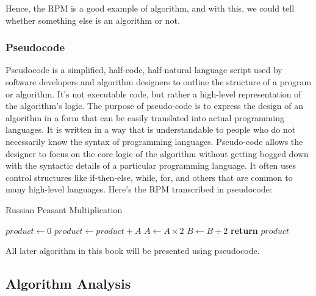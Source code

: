 \documentclass[
	12pt, %
	fleqn, %
	a4paper, %
]{LegrandOrangeBook}
\begin{document}
Hence, the RPM is a good example of algorithm, and with this, we could tell whether
something else is an algorithm or not.
\subsubsection{Pseudocode}
Pseudocode is a simplified, half-code, half-natural language script used by software developers and algorithm designers to outline the structure of a program or algorithm. It's not executable code, but rather a high-level representation of the algorithm's logic. The purpose of pseudo-code is to express the design of an algorithm in a form that can be easily translated into actual programming languages. It is written in a way that is understandable to people who do not necessarily know the syntax of programming languages. Pseudo-code allows the designer to focus on the core logic of the algorithm without getting bogged down with the syntactic details of a particular programming language. It often uses control structures like if-then-else, while, for, and others that are common to many high-level languages.
Here's the RPM transcribed in pseudocode:
\begin{algorithm}[H]
	\caption{Russian Peasant Multiplication}\label{alg:rpm}
	\begin{algorithmic}[1]
		\State $product \gets 0$
				\State $product \gets product + A$
			\EndIf
			\State $A \gets A \times 2$
			\State $B \gets B \div 2$
		\EndWhile
		\State \textbf{return} $product$
	\EndProcedure
	\end{algorithmic}
	\end{algorithm}
	
	All later algorithm in this book will be presented using pseudocode.

\subsection{Algorithm Analysis}
\end{document}
